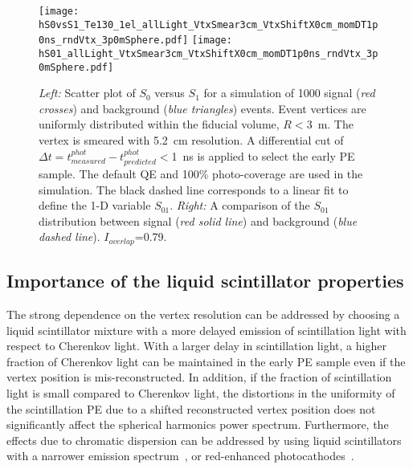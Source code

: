 \begin{figure*}[h]
  \centering
  \texttt{[image: hS0vsS1\_Te130\_1el\_allLight\_VtxSmear3cm\_VtxShiftX0cm\_momDT1p0ns\_rndVtx\_3p0mSphere.pdf]}
  \texttt{[image: hS01\_allLight\_VtxSmear3cm\_VtxShiftX0cm\_momDT1p0ns\_rndVtx\_3p0mSphere.pdf]}
  \caption{\emph{Left:} Scatter plot of $S_0$ versus $S_1$ for a
    simulation of 1000 signal (\emph{red crosses}) and background
    (\emph{blue triangles}) events. Event vertices are uniformly
    distributed within the fiducial volume, $R<3$~m.  The vertex is
    smeared with 5.2~cm resolution. A differential cut of $\Delta
    t=t^{phot}_{measured} - t^{phot}_{predicted}<$1~ns is applied to
    select the early PE sample.  The default QE and 100\% photo-coverage
    are used in the simulation.  The black dashed line corresponds to a
    linear fit to define the 1-D variable $S_{01}$.
    \emph{Right:} A comparison of the $S_{01}$ distribution between
    signal (\emph{red solid line}) and background (\emph{blue dashed
    line}).  $I_{overlap}$=0.79.}
\label{fig:SL_Te_SmearX3cm_momDT1ns_rndVtx_3p0m}
\end{figure*}



\subsection{Importance of the liquid scintillator properties}
The strong dependence on the vertex resolution can be addressed by
choosing a liquid scintillator mixture with a more delayed emission of
scintillation light with respect to Cherenkov light. With a larger
delay in scintillation light, a higher fraction of Cherenkov light can
be maintained in the early PE sample even if 
the vertex position is mis-reconstructed. 
In addition, if the fraction of scintillation light is small
compared to Cherenkov light, the distortions in the uniformity of the
scintillation PE due to a shifted reconstructed vertex position does
not significantly affect the spherical harmonics power
spectrum. Furthermore, the effects due to chromatic dispersion can be
addressed by using liquid scintillators with a narrower emission
spectrum~\cite{Aberle2014}, or red-enhanced
photocathodes~\cite{Aberle2014}.



